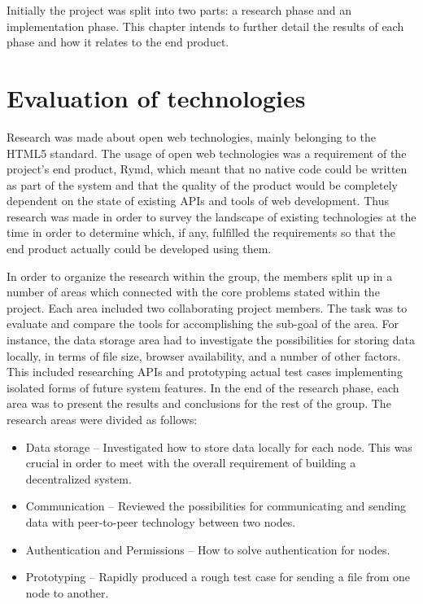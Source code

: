 Initially the project was split into two parts: a research phase and an implementation phase. This chapter intends to further detail the results of each phase and how it relates to the end product.

\section{Evaluation of technologies}

Research was made about open web technologies, mainly belonging to the HTML5 standard. The usage of open web technologies was a requirement of the project's end product, Rymd, which meant that no native code could be written as part of the system and that the quality of the product would be completely dependent on the state of existing APIs and tools of web development. Thus research was made in order to survey the landscape of existing technologies at the time in order to determine which, if any, fulfilled the requirements so that the end product actually could be developed using them.

In order to organize the research within the group, the members split up in a number of areas which connected with the core problems stated within the project. Each area included two collaborating project members. The task was to evaluate and compare the tools for accomplishing the sub-goal of the area. For instance, the data storage area had to investigate the possibilities for storing data locally, in terms of file size, browser availability, and a number of other factors. This included researching APIs and prototyping actual test cases implementing isolated forms of future system features. In the end of the research phase, each area was to present the results and conclusions for the rest of the group. The research areas were divided as follows:

\begin{itemize}
\item Data storage – Investigated how to store data locally for each node. This was crucial in order to meet with the overall requirement of building a decentralized system.
\item Communication – Reviewed the possibilities for communicating and sending data with peer-to-peer technology between two nodes.
\item Authentication and Permissions – How to solve authentication for nodes.
\item Prototyping – Rapidly produced a rough test case for sending a file from one node to another.
\end{itemize}

